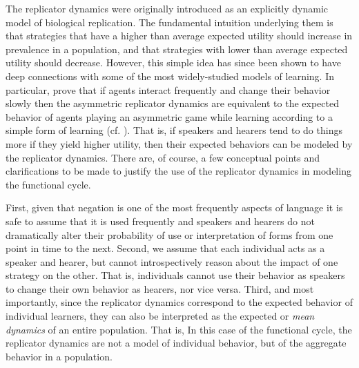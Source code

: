 \documentclass[linguex]{sp}
\theoremstyle{definition} \newtheorem{definition}{Definition}
\begin{document}
The replicator dynamics were originally introduced as an explicitly dynamic model of biological replication. The fundamental intuition underlying them is that strategies that have a higher than average expected utility should increase in prevalence in a population, and that strategies with lower than average expected utility should decrease. However, this simple idea has since been shown to have deep connections with some of the most widely-studied models of learning. In particular, \cite{borgers-sarin1997} prove that if agents interact frequently and change their behavior slowly then the asymmetric replicator dynamics are equivalent to the expected behavior of agents playing an asymmetric game while learning according to a simple form of learning (cf. \citealt{bush-mosteller1955, sutton-barto1998}). That is, if speakers and hearers tend to do things more if they yield higher utility, then their expected behaviors can be modeled by the replicator dynamics. There are, of course, a few conceptual points and clarifications to be made to justify the use of the replicator dynamics in modeling the functional cycle. 

First, given that negation is one of the most frequently aspects of language  it is safe to assume that it is used frequently and speakers and hearers do not dramatically alter their probability of use or interpretation of forms from one point in time to the next.  Second, we assume that each individual acts as a speaker and hearer, but cannot introspectively reason about the impact of one strategy on the other. That is, individuals cannot use their behavior as speakers to change their own behavior as hearers, nor vice versa. Third, and most importantly, since the replicator dynamics correspond to the expected behavior of individual learners, they can also be interpreted as the expected or \emph{mean dynamics} of an entire population. That is, 
 In this case of the functional cycle, the replicator dynamics are not a model of individual behavior, but of the aggregate behavior in a population.
\end{document}
